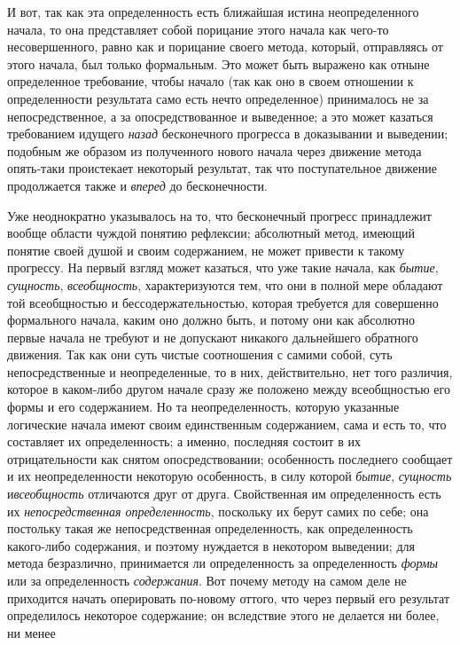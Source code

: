 \documentclass[twoside]{article}
\begin{document}
{{И вот, так как эта определенность есть ближайшая истина
неопределенного начала, то она представляет собой порицание этого начала
как чего-то несовершенного, равно как и порицание своего метода, который,
отправляясь от этого начала, был только формальным. Это может быть выражено
как отныне определенное требование, чтобы начало (так как оно в своем
отношении к определенности результата само есть нечто определенное)
принималось не за непосредственное, а за опосредствованное и
выведенное; а это может казаться требованием идущего
{\em назад} бесконечного
прогресса в доказывании и выведении; подобным же образом из полученного
нового начала через движение метода опять-таки проистекает некоторый
результат, так что поступательное движение продолжается также и
{\em вперед} до
бесконечности.

Уже неоднократно указывалось на то, что бесконечный прогресс
принадлежит вообще области чуждой понятию рефлексии; абсолютный метод,
имеющий понятие своей душой и своим содержанием, не может привести к такому
прогрессу. На первый взгляд может казаться, что уже такие начала, как
{\em бытие},
{\em сущность},
{\em всеобщность},
характеризуются тем, что они в полной мере обладают той
всеобщностью и бессодержательностью, которая требуется для совершенно
формального начала, каким оно должно быть, и потому они как абсолютно
первые начала не требуют и не допускают никакого дальнейшего обратного
движения. Так как они суть чистые соотношения с самими собой, суть
непосредственные и неопределенные, то в них, действительно, нет того
различия, которое в каком-либо другом начале сразу же положено между
всеобщностью его формы и его содержанием. Но та неопределенность, которую
указанные логические начала имеют своим единственным содержанием, сама и
есть то, что составляет их определенность; а именно, последняя состоит в их
отрицательности как снятом опосредствовании; особенность последнего
сообщает и их неопределенности некоторую особенность, в силу которой
{\em бытие},
{\em сущность
}и{\em  всеобщность}
отличаются друг от друга. Свойственная им определенность есть
их {\em непосредственная
определенность}, поскольку их берут самих по себе; она
постольку такая же непосредственная определенность, как определенность
какого-либо содержания, и поэтому нуждается в некотором выведении; для
метода безразлично, принимается ли определенность за определенность
{\em формы} или за
определенность {\em содержания}.
Вот почему методу на самом деле не приходится начать
оперировать по-новому оттого, что через первый его результат определилось
некоторое содержание; он вследствие этого не делается ни более, ни менее
}}
\end{document}
